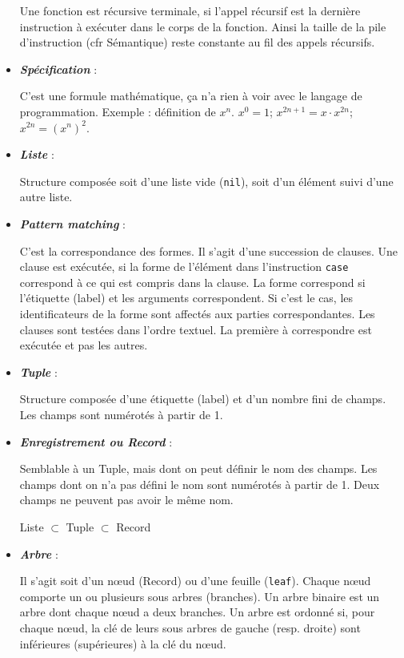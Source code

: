 \begin{itemize}
    Une fonction est récursive terminale, si l'appel récursif est la dernière instruction à exécuter dans le corps de la fonction. Ainsi la taille de la pile d'instruction (cfr Sémantique) reste constante au fil des appels récursifs.

  \item \textbf{\textit{Spécification}} :

    C'est une formule mathématique, ça n'a rien à voir avec le langage de programmation.
    Exemple : définition de $x^n$. $x^0=1$; $x^{2n+1}=x\cdot x^{2n}$; $x^{2n} = (x^n)^2$.

  \item \textbf{\textit{Liste}} :

    Structure composée soit d'une liste vide (\verb$nil$), soit d'un élément suivi d'une autre liste.

  \item \textbf{\textit{Pattern matching}} :

    C'est la correspondance des formes. Il s'agit d'une succession de clauses. Une clause est exécutée, si la forme de l'élément dans l'instruction \verb$case$ correspond à ce qui est compris dans la clause. La forme correspond si l'étiquette (label) et les arguments correspondent. Si c'est le cas, les identificateurs de la forme sont affectés aux parties correspondantes. Les clauses sont testées dans l'ordre textuel. La première à correspondre est exécutée et pas les autres.

  \item \textbf{\textit{Tuple}} :

    Structure composée d'une étiquette (label) et d'un nombre fini de champs. Les champs sont numérotés à partir de 1.

  \item \textbf{\textit{Enregistrement ou Record}} :

    Semblable à un Tuple, mais dont on peut définir le nom des champs. Les champs dont on n'a pas défini le nom sont numérotés à partir de 1. Deux champs ne peuvent pas avoir le même nom.

    Liste $\subset$ Tuple $\subset$ Record

  \item \textbf{\textit{Arbre}} :

    Il s'agit soit d'un nœud (Record) ou d'une feuille (\verb$leaf$). Chaque nœud comporte un ou plusieurs sous arbres (branches). Un arbre binaire est un arbre dont chaque nœud a deux branches. Un arbre est ordonné si, pour chaque nœud, la clé de leurs sous arbres de gauche (resp. droite) sont inférieures (supérieures) à la clé du nœud.


\end{itemize}
